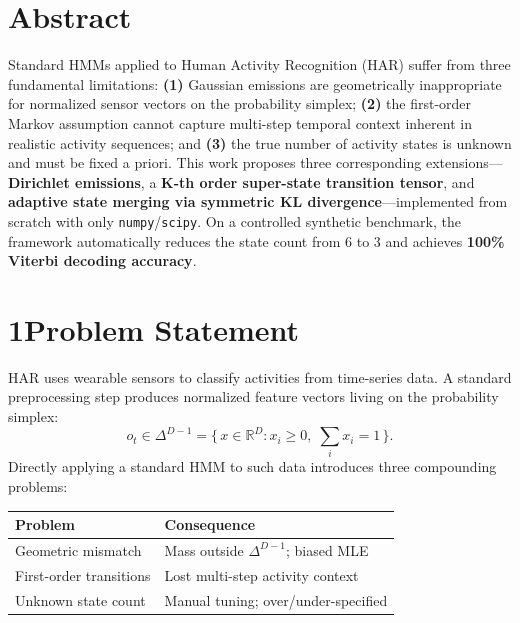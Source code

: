 \documentclass[10pt,a4paper,twocolumn]{article}
\begin{document}
\thispagestyle{fancy}

\section*{Abstract}

Standard HMMs applied to Human Activity Recognition (HAR) suffer from three fundamental limitations: \textbf{(1)} Gaussian emissions are geometrically inappropriate for normalized sensor vectors on the probability simplex; \textbf{(2)} the first-order Markov assumption cannot capture multi-step temporal context inherent in realistic activity sequences; and \textbf{(3)} the true number of activity states is unknown and must be fixed a priori.
This work proposes three corresponding extensions---\textbf{Dirichlet emissions}, a \textbf{K-th order super-state transition tensor}, and \textbf{adaptive state merging via symmetric KL divergence}---implemented from scratch with only \texttt{numpy}/\texttt{scipy}.
On a controlled synthetic benchmark, the framework automatically reduces the state count from 6 to 3 and achieves \textbf{100\% Viterbi decoding accuracy}.

\section*{1\enspace Problem Statement}

HAR uses wearable sensors to classify activities from time-series data. A standard preprocessing step produces normalized feature vectors living on the probability simplex:
\[
  o_t \in \Delta^{D-1}=\bigl\{\,x\in\mathbb{R}^D : x_i\geq 0,\;\textstyle\sum_i x_i=1\,\bigr\}.
\]
Directly applying a standard HMM to such data introduces three compounding problems:

\begin{center}
\footnotesize
\begin{tabular}{@{}ll@{}}
\toprule
\textbf{Problem} & \textbf{Consequence} \\
\midrule
Geometric mismatch   & Mass outside $\Delta^{D-1}$; biased MLE \\
First-order transitions & Lost multi-step activity context \\
Unknown state count  & Manual tuning; over/under-specified \\
\bottomrule
\end{tabular}
\end{center}
\end{document}
